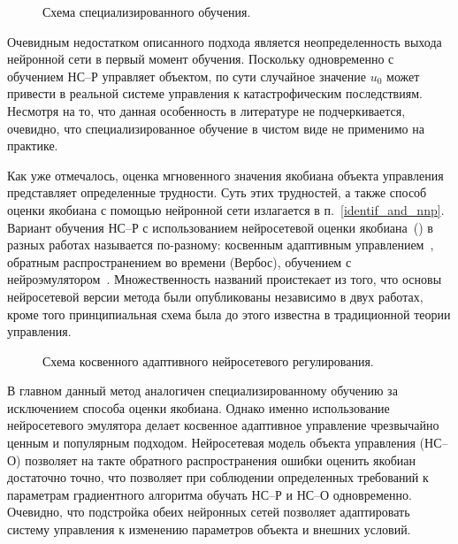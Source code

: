 \begin{figure}[h]
\centering

\caption{Схема специализированного обучения.}
\label{fig:special_nnc}
\end{figure}

Очевидным недостатком описанного подхода является неопределенность
выхода нейронной сети в первый момент обучения.  Поскольку
одновременно с обучением НС--Р управляет объектом, по сути случайное
значение $u_0$ может привести в реальной системе управления к
катастрофическим последствиям.  Несмотря на то, что данная особенность
в литературе не подчеркивается, очевидно, что специализированное
обучение в чистом виде не применимо на практике.


Как уже отмечалось, оценка мгновенного значения якобиана объекта
управления представляет определенные трудности.  Суть этих трудностей,
а также способ оценки якобиана с помощью нейронной сети излагается в
п.~\ref{identif_and_nnp}.  Вариант обучения НС--Р с использованием
нейросетевой оценки якобиана~() в разных
работах называется по-разному: косвенным адаптивным
управлением~\cite{narpart92}, обратным распространением во времени
(Вербос), обучением с нейроэмулятором~\cite{sigom00}.  Множественность
названий проистекает из того, что основы нейросетевой версии метода
были опубликованы независимо в двух работах, кроме того принципиальная
схема была до этого известна в традиционной теории управления.

\begin{figure}[h]
\centering

\caption{Схема косвенного адаптивного нейросетевого регулирования.}
\label{fig:indirect_nnc}
\end{figure}

В главном данный метод аналогичен специализированному обучению за
исключением способа оценки якобиана.  Однако именно использование
нейросетевого эмулятора делает косвенное адаптивное управление
чрезвычайно ценным и популярным подходом.  Нейросетевая модель объекта
управления (НС--О) позволяет на такте обратного распространения ошибки
оценить якобиан достаточно точно, что позволяет при соблюдении
определенных требований к параметрам градиентного алгоритма обучать
НС--Р и НС--О одновременно.  Очевидно, что подстройка обеих нейронных
сетей позволяет адаптировать систему управления к изменению параметров
объекта и внешних условий.

